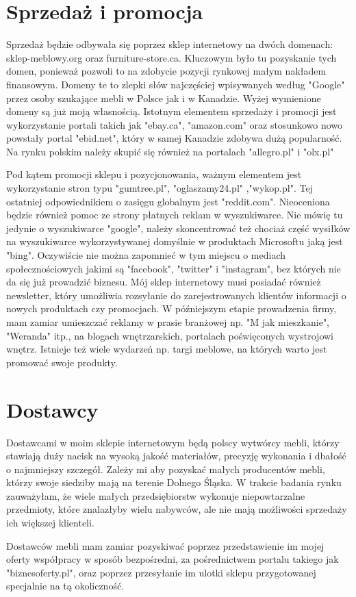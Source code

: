 	
	\section{Sprzedaż i promocja}
		\par Sprzedaż będzie odbywała się poprzez sklep internetowy na dwóch domenach: sklep-meblowy.org oraz furniture-store.ca. Kluczowym było tu pozyskanie tych domen, ponieważ pozwoli to na zdobycie pozycji rynkowej małym nakładem finansowym. Domeny te to zlepki słów najczęściej wpisywanych według "Google" przez osoby szukające mebli w Polsce jak i w Kanadzie. Wyżej wymienione domeny są już moją własnością. Istotnym elementem sprzedaży i promocji jest wykorzystanie portali takich jak "ebay.ca", "amazon.com" oraz stosunkowo nowo powstały portal "ebid.net", który w samej Kanadzie zdobywa dużą popularność. Na rynku polskim należy skupić się również na portalach "allegro.pl" i "olx.pl"
	
		\par Pod kątem promocji sklepu i pozycjonowania, ważnym elementem jest wykorzystanie stron typu "gumtree.pl", "oglaszamy24.pl" ,"wykop.pl". Tej ostatniej odpowiednikiem o zasięgu globalnym jest "reddit.com".  Nieoceniona będzie również pomoc ze strony płatnych reklam w wyszukiwarce. Nie mówię tu jedynie o wyszukiwarce "google", należy skoncentrować też chociaż część wysiłków na wyszukiwarce wykorzystywanej domyślnie w produktach Microsoftu jaką jest "bing". Oczywiście nie można zapomnieć w tym miejscu o mediach społecznościowych jakimi są "facebook", "twitter" i "instagram", bez których nie da się już prowadzić biznesu. Mój sklep internetowy musi posiadać również  newsletter, który umożliwia rozsyłanie do zarejestrowanych klientów informacji o nowych produktach czy promocjach. W późniejszym etapie prowadzenia firmy, mam zamiar umieszczać reklamy w prasie branżowej np. "M jak mieszkanie", "Weranda" itp., na blogach wnętrzarskich, portalach poświęconych wystrojowi wnętrz. Istnieje też wiele wydarzeń np. targi meblowe, na których warto jest promować swoje produkty.
		
		
	\section{Dostawcy}
		\par Dostawcami w moim sklepie internetowym będą polscy wytwórcy mebli, którzy stawiają duży nacisk na wysoką jakość materiałów, precyzję wykonania i dbałość o najmniejszy szczegół. Zależy mi aby pozyskać małych producentów mebli, którzy swoje siedziby mają na terenie Dolnego Śląska. W trakcie badania rynku zauważyłam, że wiele małych przedsiębiorstw wykonuje niepowtarzalne przedmioty, które znalazłyby wielu nabywców, ale nie mają możliwości sprzedaży ich większej klienteli. 
		\par Dostawców mebli mam zamiar pozyskiwać poprzez przedstawienie im mojej oferty współpracy w sposób bezpośredni, za pośrednictwem portalu takiego jak "biznesoferty.pl", oraz poprzez przesyłanie im ulotki sklepu przygotowanej specjalnie na tą okoliczność.
		
